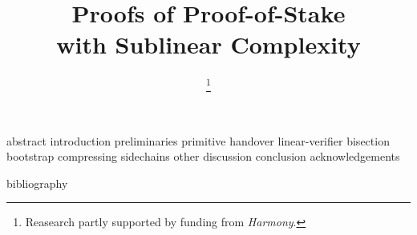 \documentclass[conference]{IEEEtran}
\begin{document}
\title{Proofs of Proof-of-Stake\\with Sublinear Complexity}

\ifanonymous\else
\author{\thanks{Reasearch partly supported by funding from \emph{Harmony}.}
}
\fi

\IEEEoverridecommandlockouts
\makeatletter{}\makeatother
{}

\maketitle

{abstract}
{introduction}
{preliminaries}
{primitive}
{handover}
{linear-verifier}
{bisection}
{bootstrap}
{compressing}
{sidechains}
{other}
{discussion}
{conclusion}
\ifanonymous\else
{acknowledgements}
\fi

{bibliography}
\end{document}
